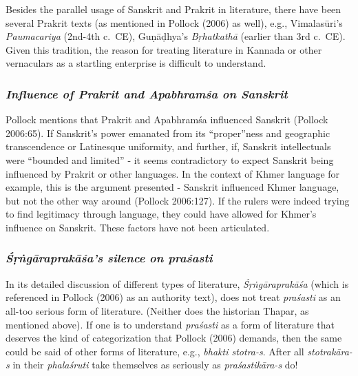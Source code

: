 Besides the parallel usage of Sanskrit and Prakrit in literature, there have been several Prakrit texts (as mentioned in Pollock (2006) as well), e.g., Vimalasūri’s {\sl Paumacariya} (2nd-4th c.\ CE), Guṇāḍhya’s {\sl Bṛhatkathā} (earlier than 3rd c.\ CE). Given this tradition, the reason for treating literature in Kannada or other vernaculars as a startling enterprise is difficult to understand.

\subsubsection{{\sl Influence of Prakrit and Apabhramśa on Sanskrit}}

Pollock mentions that Prakrit and Apabhramśa influenced Sanskrit (Pollock 2006:65). If Sanskrit’s power emanated from its “proper”ness and geographic transcendence or Latinesque uniformity, and further, if, Sanskrit intellectuals were “bounded and limited” - it seems contradictory to expect Sanskrit being influenced by Prakrit or other languages. In the context of Khmer language for example, this is the argument presented - Sanskrit influenced Khmer language, but not the other way around (Pollock 2006:127). If the rulers were indeed trying to find legitimacy through language, they could have allowed for Khmer’s influence on Sanskrit. These factors have not been articulated. 

\subsubsection{{\sl Śṛṅgāraprakāśa’s silence on praśasti}}

In its detailed discussion of different types of literature, {\sl Śṛṅgāraprakāśa} (which is referenced in Pollock (2006) as an authority text), does not treat {\sl praśasti} as an all-too serious form of literature. (Neither does the historian Thapar, as mentioned above). If one is to understand {\sl praśasti} as a form of literature that deserves the kind of categorization that Pollock (2006) demands, then the same could be said of other forms of literature, e.g., {\sl bhakti stotra-s}. After all {\sl stotrakāra-s} in their {\sl phalaśruti} take themselves as seriously as {\sl praśastikāra-s} do! 
\vskip -10pt


